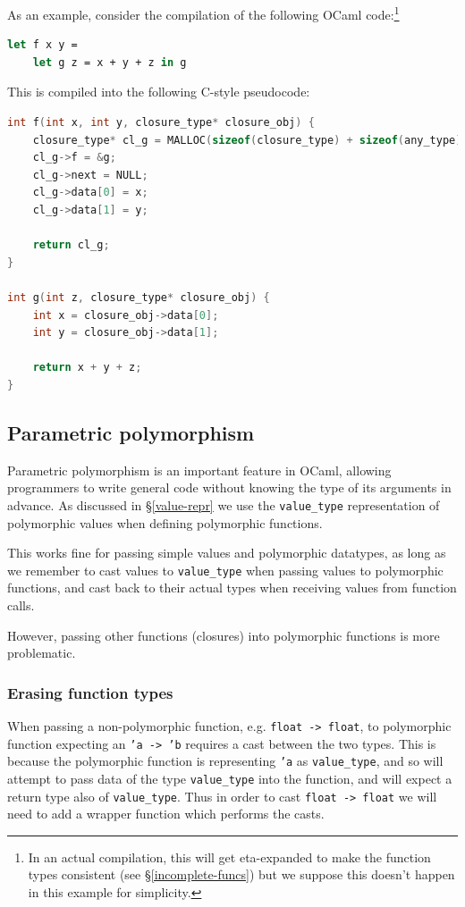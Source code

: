 As an example, consider the compilation of the following OCaml 
code:\footnote{In an actual compilation, this will get eta-expanded to make the 
function types consistent (see \S\ref{incomplete-funcs}) but we suppose 
this doesn't happen in this example for simplicity.}

\begin{lstlisting}[language=Caml]
let f x y =
    let g z = x + y + z in g
\end{lstlisting}

This is compiled into the following C-style pseudocode:

\begin{lstlisting}[language=C]
int f(int x, int y, closure_type* closure_obj) {
    closure_type* cl_g = MALLOC(sizeof(closure_type) + sizeof(any_type)*2);
    cl_g->f = &g;
    cl_g->next = NULL;
    cl_g->data[0] = x;
    cl_g->data[1] = y;
    
    return cl_g;
}

int g(int z, closure_type* closure_obj) {
    int x = closure_obj->data[0];
    int y = closure_obj->data[1];
    
    return x + y + z;
}
\end{lstlisting}

\subsection{Parametric polymorphism}

Parametric polymorphism is an important feature in OCaml, allowing programmers
to write general code without knowing the type of its arguments in advance. As
discussed in \S\ref{value-repr} we use the \verb|value_type| representation of
polymorphic values when defining polymorphic functions.

This works fine for passing simple values and polymorphic datatypes, as long as 
we remember to cast values to \verb|value_type| when passing values to 
polymorphic functions, and cast back to their actual types when receiving 
values from function calls.

However, passing other functions (closures) into polymorphic functions is more 
problematic.

\subsubsection{Erasing function types}

When passing a non-polymorphic function, e.g. \texttt{float -> float}, to
polymorphic function expecting an \texttt{'a -> 'b} requires a cast between the
two types. This is because the polymorphic function is representing \texttt{'a}
as \verb|value_type|, and so will attempt to pass data of the type
\verb|value_type| into the function, and will expect a return type also of
\verb|value_type|. Thus in order to cast \texttt{float -> float} we will need to
add a wrapper function which performs the casts.

